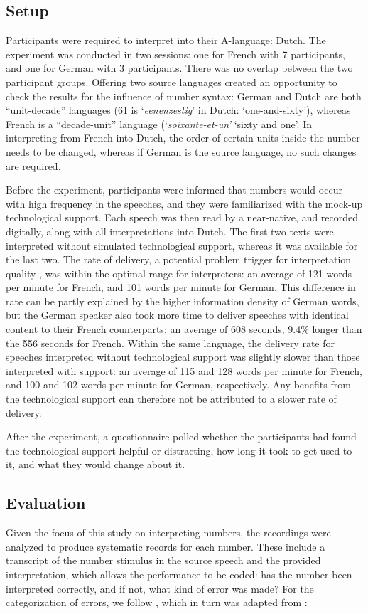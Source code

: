 \documentclass[output=paper]{langsci/langscibook}
\begin{document}
\subsection{Setup}
Participants were required to interpret into their A-language: Dutch. The experiment was conducted in two sessions: one for French with 7 participants, and one for German with 3 participants. There was no overlap between the two participant groups. Offering two source languages created an opportunity to check the results for the influence of number syntax: German and Dutch are both “unit-decade” languages (61 is ‘\textit{eenenzestig}’ in Dutch: ‘one-and-sixty’), whereas French is a “decade-unit” language (‘\textit{soixante-et-un’} ‘sixty and one’. In interpreting from French into Dutch, the order of certain units inside the number needs to be changed, whereas if German is the source language, no such changes are required.

Before the experiment, participants were informed that numbers would occur with high frequency in the speeches, and they were familiarized with the mock-up technological support. Each speech was then read by a near-native, and recorded digitally, along with all interpretations into Dutch. The first two texts were interpreted without simulated technological support, whereas it was available for the last two. The rate of delivery, a potential problem trigger for interpretation quality \citep{Gile1995}, was within the optimal range for interpreters: an average of 121 words per minute for French, and 101 words per minute for German. This difference in rate can be partly explained by the higher information density of German words, but the German speaker also took more time to deliver speeches with identical content to their French counterparts: an average of 608 seconds, 9.4\% longer than the 556 seconds for French. Within the same language, the delivery rate for speeches interpreted without technological support was slightly slower than those interpreted with support: an average of 115 and 128 words per minute for French, and 100 and 102 words per minute for German, respectively. Any benefits from the technological support can therefore not be attributed to a slower rate of delivery.

After the experiment, a questionnaire polled whether the participants had found the technological support helpful or distracting, how long it took to get used to it, and what they would change about it.

\subsection{Evaluation}
Given the focus of this study on interpreting numbers, the recordings were analyzed to produce systematic records for each number. These include a transcript of the number stimulus in the source speech and the provided interpretation, which allows the performance to be coded: has the number been interpreted correctly, and if not, what kind of error was made? For the categorization of errors, we follow \citet{Pinochi2009}, which in turn was adapted from \citet{Braun1996}:
\end{document}

